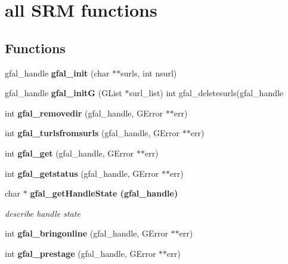 \section{all SRM functions}
\label{group__srm__group}
\subsection*{Functions}
\begin{CompactItemize}
\item 
gfal\_\-handle \textbf{gfal\_\-init} (char $\ast$$\ast$surls, int nsurl)\label{group__srm__group_g2cba61c672fd4b6d3c8e3d1a39996eca}

\item 
gfal\_\-handle \textbf{gfal\_\-init\-G} (GList $\ast$surl\_\-list) int gfal\_\-deletesurls(gfal\_\-handle\label{group__srm__group_g57f80a6142b085837cbc1b41d966b3fd}

\item 
int \textbf{gfal\_\-removedir} (gfal\_\-handle, GError $\ast$$\ast$err)\label{group__srm__group_g86f588ad635d9857abbe1b12d780a2d3}

\item 
int \textbf{gfal\_\-turlsfromsurls} (gfal\_\-handle, GError $\ast$$\ast$err)\label{group__srm__group_geed18ae14798b82be595bd2f7752b667}

\item 
int \textbf{gfal\_\-get} (gfal\_\-handle, GError $\ast$$\ast$err)\label{group__srm__group_g696da32502408c77fcebc440aa6c46ba}

\item 
int \textbf{gfal\_\-getstatus} (gfal\_\-handle, GError $\ast$$\ast$err)\label{group__srm__group_g0de517db68fac8b99b6e4cf3ab413485}

\item 
char $\ast$ \bf{gfal\_\-get\-Handle\-State} (gfal\_\-handle)
\begin{CompactList}\small\item\em describe handle state \item\end{CompactList}\item 
int \textbf{gfal\_\-bringonline} (gfal\_\-handle, GError $\ast$$\ast$err)\label{group__srm__group_g8df147aadc31a312b25c40fc9a3df77f}

\item 
int \textbf{gfal\_\-prestage} (gfal\_\-handle, GError $\ast$$\ast$err)\label{group__srm__group_g7203e8c1902d92bd349baa0bb1120868}


\end{CompactItemize}

